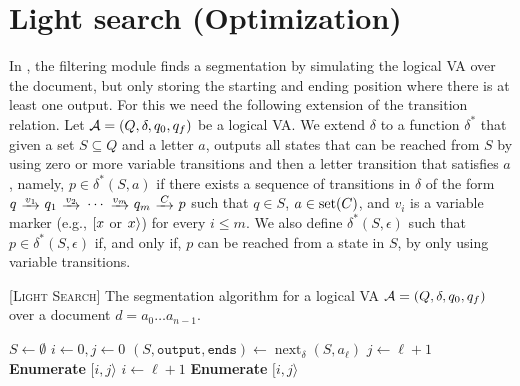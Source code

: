 
\section{Light search (Optimization)}

In \rematch, the filtering module finds a segmentation by simulating the logical VA over the document, but only storing the starting and ending position where there is at least one output. For this we need the following extension of the transition relation.
Let $\mathcal{A} = (Q, \delta, q_0, q_f)$ be a logical VA.
We extend $\delta$ to a function $\delta^*$ that given a set $S \subseteq Q$ and a letter $a$, outputs all states that can be reached from $S$ by using zero or more variable transitions and then a letter transition that satisfies $a$, namely, $p \in \delta^*(S,a)$ if there exists a sequence of transitions in $\delta$ of the form
$
	q \ \trans{v_1} \ q_1 \ \trans{v_2} \ \cdots \ \trans{v_m} \ q_m \ \trans{C} \ p
$
such that $q \in S$, $a \in \operatorname{set}(C)$, and $v_i$ is a variable marker (e.g., $[ x$ or $x \rangle$) for every $i \leq m$. We also define $\delta^*(S,\epsilon)$ such that $p \in \delta^*(S,\epsilon)$ if, and only if, $p$ can be reached from a state in $S$, by only using variable transitions.

\newcommand{\foutput}{\texttt{output}}
\newcommand{\fends}{\texttt{ends}}
\newcommand{\fnext}{\operatorname{next}_{\delta}}



\begin{algorithm}[t]
	\caption{[\textsc{Light Search}] The segmentation algorithm for a logical VA $\mathcal{A} = (Q, \delta, q_0, q_f)$ over a document $d = a_0 \ldots a_{n-1}$.}\label{alg:segmentation}
	\begin{algorithmic}[1]
		\State $S \gets \emptyset$
		\State $i \gets 0, j \gets 0$
		\State $(S, \foutput, \fends) \gets \fnext(S, a_\ell)$
		\If{$\foutput$}
		\State $j \gets \ell+1$
		\ElsIf{$\fends$}
		\State \textbf{Enumerate} $[i, j\rangle$
		\EndIf
		\State $i \gets \ell + 1$
		\EndIf
		\EndFor
		\State \textbf{Enumerate} $[i, j\rangle$
		\EndIf
		\EndProcedure
	\end{algorithmic}
\end{algorithm}

